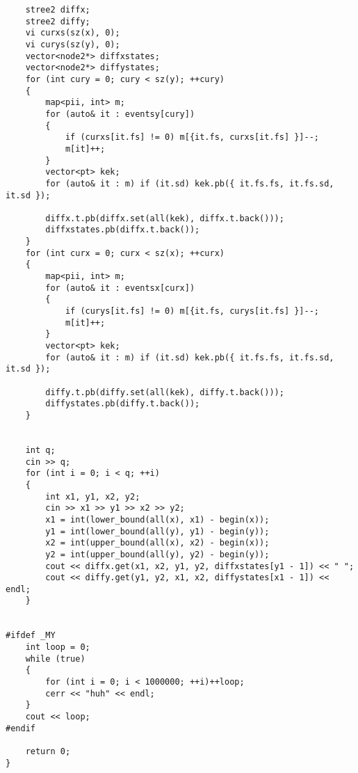 \documentclass[a4paper,12pt]{report}
\begin{document}
\begin{lstlisting}
	stree2 diffx;
	stree2 diffy;
	vi curxs(sz(x), 0);
	vi curys(sz(y), 0);
	vector<node2*> diffxstates;
	vector<node2*> diffystates;
	for (int cury = 0; cury < sz(y); ++cury)
	{
		map<pii, int> m;
		for (auto& it : eventsy[cury])
		{
			if (curxs[it.fs] != 0) m[{it.fs, curxs[it.fs] }]--;
			m[it]++;
		}
		vector<pt> kek;
		for (auto& it : m) if (it.sd) kek.pb({ it.fs.fs, it.fs.sd, it.sd });

		diffx.t.pb(diffx.set(all(kek), diffx.t.back()));
		diffxstates.pb(diffx.t.back());
	}
	for (int curx = 0; curx < sz(x); ++curx)
	{
		map<pii, int> m;
		for (auto& it : eventsx[curx])
		{
			if (curys[it.fs] != 0) m[{it.fs, curys[it.fs] }]--;
			m[it]++;
		}
		vector<pt> kek;
		for (auto& it : m) if (it.sd) kek.pb({ it.fs.fs, it.fs.sd, it.sd });

		diffy.t.pb(diffy.set(all(kek), diffy.t.back()));
		diffystates.pb(diffy.t.back());
	}


	int q;
	cin >> q;
	for (int i = 0; i < q; ++i)
	{
		int x1, y1, x2, y2;
		cin >> x1 >> y1 >> x2 >> y2;
		x1 = int(lower_bound(all(x), x1) - begin(x));
		y1 = int(lower_bound(all(y), y1) - begin(y));
		x2 = int(upper_bound(all(x), x2) - begin(x));
		y2 = int(upper_bound(all(y), y2) - begin(y));
		cout << diffx.get(x1, x2, y1, y2, diffxstates[y1 - 1]) << " ";
		cout << diffy.get(y1, y2, x1, x2, diffystates[x1 - 1]) << endl;
	}


#ifdef _MY
	int loop = 0;
	while (true)
	{
		for (int i = 0; i < 1000000; ++i)++loop;
		cerr << "huh" << endl;
	}
	cout << loop;
#endif

	return 0;
}
\end{lstlisting}
\end{document}
